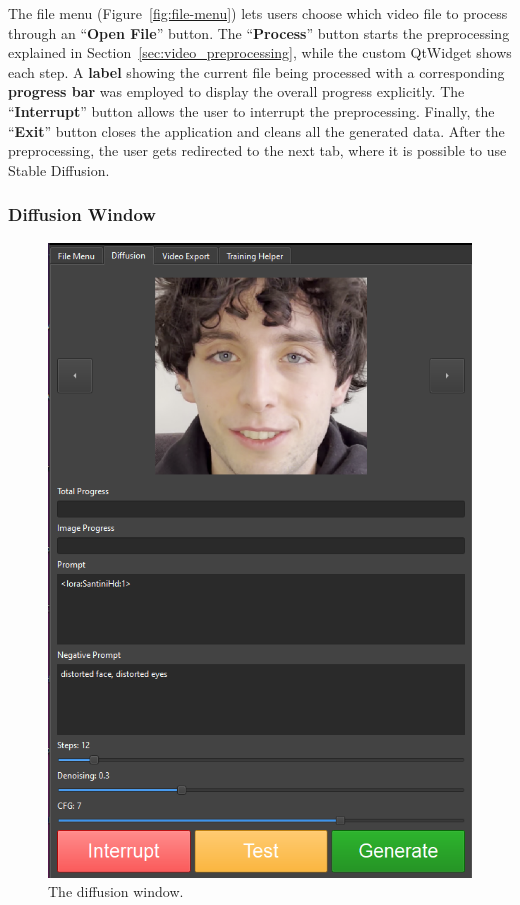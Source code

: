 \documentclass[preprint]{elsarticle}
\begin{document}
The file menu (Figure~\ref{fig:file-menu}) lets users choose which video file to process through 
an ``\textbf{Open File}'' button. 
The ``\textbf{Process}'' button starts the preprocessing explained in Section~\ref{sec:video_preprocessing}, 
while the custom QtWidget shows each step. 
A \textbf{label} showing the current file being processed with a corresponding \textbf{progress bar} 
was employed to display the overall progress explicitly. The ``\textbf{Interrupt}'' button allows the user to interrupt the preprocessing.  Finally, the ``\textbf{Exit}'' button closes the application and cleans all the generated data. 
After the preprocessing, the user gets redirected to the next tab, where it is possible to use Stable Diffusion. 



\subsubsection{Diffusion Window}

\begin{figure}[H]
	\centering
	\includegraphics[scale=0.5, keepaspectratio]{img/project_img/generation-window.png}
	\caption{The diffusion window.}
	\label{fig:diffusion-menu}
\end{figure}
\end{document}

